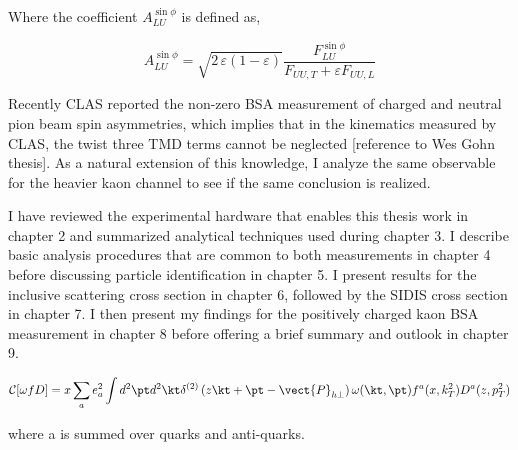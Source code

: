 Where the coefficient $A_{LU}^{\sin\phi}$ is defined as, 

\begin{equation}
  A_{LU}^{\sin\phi} = \sqrt{2\,\varepsilon (1-\varepsilon)} \frac{F_{LU}^{\sin\phi}}{F_{UU,T} + \varepsilon F_{UU,L}}
\end{equation}

Recently CLAS reported the non-zero BSA measurement of charged and neutral pion beam spin asymmetries, which implies that in the kinematics measured by CLAS, the twist three TMD terms cannot be neglected [reference to Wes Gohn thesis].  As a natural extension of this knowledge, I analyze the same observable for the heavier kaon channel to see if the same conclusion is realized.

I have reviewed the experimental hardware that enables this thesis work in chapter 2 and summarized analytical techniques used during chapter 3.  I describe basic analysis procedures that are common to both measurements in chapter 4 before discussing particle identification in chapter 5.  I present results for the inclusive scattering cross section in chapter 6, followed by the SIDIS cross section in chapter 7.  I then present my findings for the positively charged kaon BSA measurement in chapter 8 before offering a brief summary and outlook in chapter 9. 

%
%
%

\begin{equation}
  \mathcal{C}[\omega f D] = x \sum_{a} e^{2}_{a} \int d^{2}\pt d^{2}\kt \delta^{(2)} \left( z\kt + \pt - \vect{P}_{h\perp} \right) \omega (\kt, \pt) f^{a}(x, k_{T}^{2}) D^{a}(z, p_{T}^{2}) 
\end{equation}

where a is summed over quarks and anti-quarks.  
